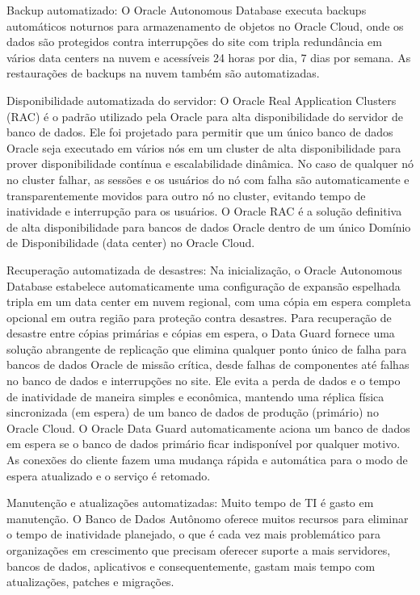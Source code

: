 \begin{alineas} 
\item Backup automatizado: O Oracle Autonomous Database executa backups automáticos noturnos para armazenamento de objetos no Oracle Cloud, onde os dados são protegidos contra interrupções do site com tripla redundância em vários data centers na nuvem e acessíveis 24 horas por dia, 7 dias por semana. As restaurações de backups na nuvem também são automatizadas.

\item Disponibilidade automatizada do servidor: O Oracle Real Application Clusters (RAC) é o padrão utilizado pela Oracle para alta disponibilidade do servidor de banco de dados. Ele foi projetado para permitir que um único banco de dados Oracle seja executado em vários nós em um cluster de alta disponibilidade para prover disponibilidade contínua e escalabilidade dinâmica. No caso de qualquer nó no cluster falhar, as sessões e os usuários do nó com falha são automaticamente e transparentemente movidos para outro nó no cluster, evitando tempo de inatividade e interrupção para os usuários. O Oracle RAC é a solução definitiva de alta disponibilidade para bancos de dados Oracle dentro de um único Domínio de Disponibilidade (data center) no Oracle Cloud.

\item Recuperação automatizada de desastres: Na inicialização, o Oracle Autonomous Database estabelece automaticamente uma configuração de expansão espelhada tripla em um data center em nuvem regional, com uma cópia em espera completa opcional em outra região para proteção contra desastres. Para recuperação de desastre entre cópias primárias e cópias em espera, o Data Guard fornece uma solução abrangente de replicação que elimina qualquer ponto único de falha para bancos de dados Oracle de missão crítica, desde falhas de componentes até falhas no banco de dados e interrupções no site. Ele evita a perda de dados e o tempo de inatividade de maneira simples e econômica, mantendo uma réplica física sincronizada (em espera) de um banco de dados de produção (primário) no Oracle Cloud. O Oracle Data Guard automaticamente aciona um banco de dados em espera se o banco de dados primário ficar indisponível por qualquer motivo. As conexões do cliente fazem uma mudança rápida e automática para o modo de espera atualizado e o serviço é retomado.

\item Manutenção e atualizações automatizadas: Muito tempo de TI é gasto em manutenção. O Banco de Dados Autônomo oferece muitos recursos para eliminar o tempo de inatividade planejado, o que é cada vez mais problemático para organizações em crescimento que precisam oferecer suporte a mais servidores, bancos de dados, aplicativos e consequentemente, gastam mais tempo com atualizações, patches e migrações.


\end{alineas}
